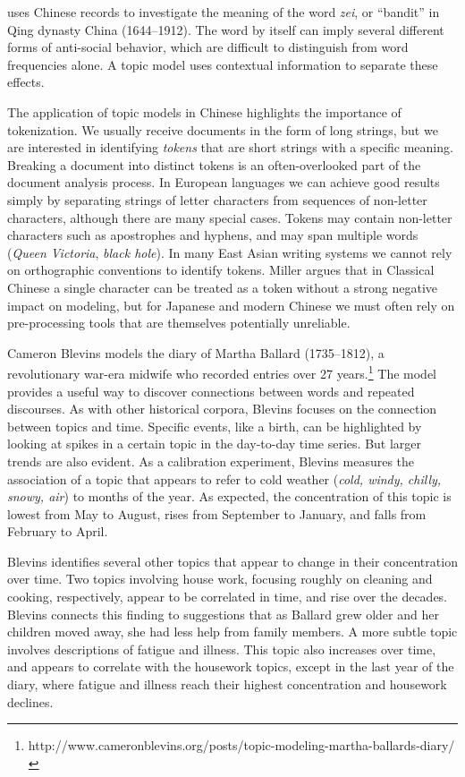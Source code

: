 \citet{miller-13} uses Chinese records to investigate the meaning of
the word {\em zei}, or ``bandit'' in Qing dynasty China (1644--1912). The word by
itself can imply several different forms of anti-social behavior,
which are difficult to distinguish from word frequencies alone. A
topic model uses contextual information to separate these effects.

The application of topic models in Chinese highlights the importance of tokenization.
We usually receive documents in the form of long strings, but we are interested in identifying {\em tokens} that are short strings with a specific meaning.
Breaking a document into distinct tokens is an often-overlooked part of the document analysis process.
In European languages we can achieve good results simply by separating strings of letter characters from sequences of non-letter characters, although there are many special cases.
Tokens may contain non-letter characters such as apostrophes and hyphens, and may span multiple words ({\em Queen Victoria}, {\em black hole}).
In many East Asian writing systems we cannot rely on orthographic conventions to identify tokens.
Miller argues that in Classical Chinese a single character can be treated as a token without a strong negative impact on modeling, but for Japanese and modern Chinese we must often rely on pre-processing tools that are themselves potentially unreliable.


Cameron Blevins models the diary of Martha Ballard (1735--1812), a revolutionary war-era midwife who recorded entries over 27 years.\footnote{http://www.cameronblevins.org/posts/topic-modeling-martha-ballards-diary/} The model provides a useful way to discover connections between words and repeated discourses.
As with other historical corpora, Blevins focuses on the connection between topics and time.
Specific events, like a birth, can be highlighted by looking at spikes in a certain topic in the day-to-day time series.
But larger trends are also evident.
As a calibration experiment, Blevins measures the association of a topic that appears to refer to cold weather ({\em cold, windy, chilly, snowy, air}) to months of the year.
As expected, the concentration of this topic is lowest from May to August, rises from September to January, and falls from February to April.

Blevins identifies several other topics that appear to change in their concentration over time.
Two topics involving house work, focusing roughly on cleaning and cooking, respectively, appear to be correlated in time, and rise over the decades.
Blevins connects this finding to suggestions that as Ballard grew older and her children moved away, she had less help from family members.
A more subtle topic involves descriptions of fatigue and illness.
This topic also increases over time, and appears to correlate with the housework topics, except in the last year of the diary, where fatigue and illness reach their highest concentration and housework declines.

